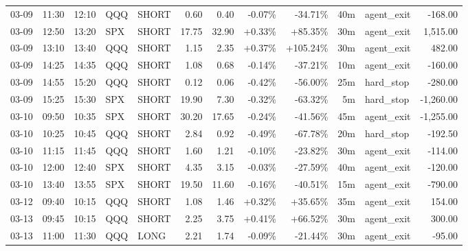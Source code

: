 \documentclass[11pt,a4paper,twoside]{article}
\begin{document}
\begin{center}
\begin{longtable}{>{\color{txtmain}}l l l l l r r r r r >{\color{txtmain}}l r}
03-09 & 11:30 & 12:10 & QQQ & SHORT & 0.60 & 0.40 & \textcolor{lossred}{-0.07\%} & \textcolor{lossred}{-34.71\%} & 40m & agent\_exit & \textcolor{lossred}{-168.00} \\
03-09 & 12:50 & 13:20 & SPX & SHORT & 17.75 & 32.90 & \textcolor{wingreen}{+0.33\%} & \textcolor{wingreen}{+85.35\%} & 30m & agent\_exit & \textcolor{wingreen}{1,515.00} \\
03-09 & 13:10 & 13:40 & QQQ & SHORT & 1.15 & 2.35 & \textcolor{wingreen}{+0.37\%} & \textcolor{wingreen}{+105.24\%} & 30m & agent\_exit & \textcolor{wingreen}{482.00} \\
03-09 & 14:25 & 14:35 & QQQ & SHORT & 1.08 & 0.68 & \textcolor{lossred}{-0.14\%} & \textcolor{lossred}{-37.21\%} & 10m & agent\_exit & \textcolor{lossred}{-160.00} \\
03-09 & 14:55 & 15:20 & QQQ & SHORT & 0.12 & 0.06 & \textcolor{lossred}{-0.42\%} & \textcolor{lossred}{-56.00\%} & 25m & hard\_stop & \textcolor{lossred}{-280.00} \\
03-09 & 15:25 & 15:30 & SPX & SHORT & 19.90 & 7.30 & \textcolor{lossred}{-0.32\%} & \textcolor{lossred}{-63.32\%} & 5m & hard\_stop & \textcolor{lossred}{-1,260.00} \\
03-10 & 09:50 & 10:35 & SPX & SHORT & 30.20 & 17.65 & \textcolor{lossred}{-0.24\%} & \textcolor{lossred}{-41.56\%} & 45m & agent\_exit & \textcolor{lossred}{-1,255.00} \\
03-10 & 10:25 & 10:45 & QQQ & SHORT & 2.84 & 0.92 & \textcolor{lossred}{-0.49\%} & \textcolor{lossred}{-67.78\%} & 20m & hard\_stop & \textcolor{lossred}{-192.50} \\
03-10 & 11:15 & 11:45 & QQQ & SHORT & 1.60 & 1.21 & \textcolor{lossred}{-0.10\%} & \textcolor{lossred}{-23.82\%} & 30m & agent\_exit & \textcolor{lossred}{-114.00} \\
03-10 & 12:00 & 12:40 & SPX & SHORT & 4.35 & 3.15 & \textcolor{lossred}{-0.03\%} & \textcolor{lossred}{-27.59\%} & 40m & agent\_exit & \textcolor{lossred}{-120.00} \\
03-10 & 13:40 & 13:55 & SPX & SHORT & 19.50 & 11.60 & \textcolor{lossred}{-0.16\%} & \textcolor{lossred}{-40.51\%} & 15m & agent\_exit & \textcolor{lossred}{-790.00} \\
03-12 & 09:40 & 10:15 & QQQ & SHORT & 1.08 & 1.46 & \textcolor{wingreen}{+0.32\%} & \textcolor{wingreen}{+35.65\%} & 35m & agent\_exit & \textcolor{wingreen}{154.00} \\
03-13 & 09:45 & 10:15 & QQQ & SHORT & 2.25 & 3.75 & \textcolor{wingreen}{+0.41\%} & \textcolor{wingreen}{+66.52\%} & 30m & agent\_exit & \textcolor{wingreen}{300.00} \\
03-13 & 11:00 & 11:30 & QQQ & LONG & 2.21 & 1.74 & \textcolor{lossred}{-0.09\%} & \textcolor{lossred}{-21.44\%} & 30m & agent\_exit & \textcolor{lossred}{-95.00} \\
\end{longtable}
\end{center}
\clearpage
\end{document}
